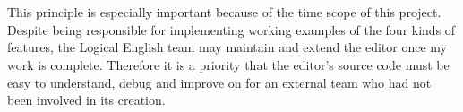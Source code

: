 \documentclass[../main.tex]{subfiles}
\begin{document}
\\
\\
This principle is especially important because of the time scope of this project. Despite being responsible for implementing working examples of the four kinds of features, the Logical English team may maintain and extend the editor once my work is complete. Therefore it is a priority that the editor's source code must be easy to understand, debug and improve on for an external team who had not been involved in its creation.
\end{document}
